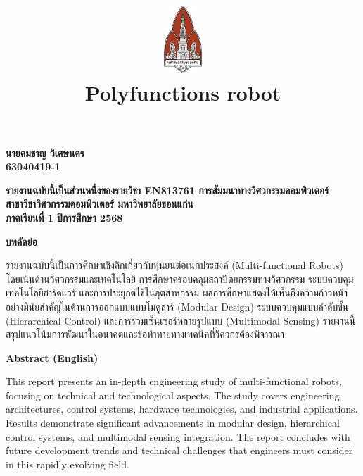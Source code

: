 \documentclass[a4paper]{article}
\date{}
\author{}
\title{
    \includegraphics[width=1in, height=1in, keepaspectratio]{logo.png}
    \\[2ex]
    {\fontsize{32pt}{36pt}\selectfont\textbf{Polyfunctions robot}}
}
\newcommand{\thaipage}[1]{%
  \ifcase#1\or ก\or ข\or ค\or ง\or จ\or ฉ\or ช\or ซ\or ฌ\or ญ\or
  ฎ\or ฏ\or ฐ\or ฑ\or ฒ\or ณ\or ด\or ต\or ถ\or ท\or ธ\or น\or บ\or ป\or ผ\or ฝ\or พ\or ฟ\or ภ\or ม\or
  ย\or ร\or ล\or ว\or ศ\or ษ\or ส\or ห\or ฬ\or อ\or ฮ\else\arabic{#1}\fi
}
\begin{document}
\maketitle
\thispagestyle{empty}

\vfill
\begin{center}
    {\fontsize{22pt}{26pt}\selectfont\textbf{
        นายคมชาญ วิเศษนคร
        \\ 63040419-1
    }}
\end{center}
\vfill

\vfill
\begin{center}
    {\fontsize{16pt}{20pt}\selectfont\textbf{
        รายงานฉบับนี้เป็นส่วนหนึ่งของรายวิชา EN813761 การสัมมนาทางวิศวกรรมคอมพิวเตอร์
        \\ สาขาวิชาวิศวกรรมคอมพิวเตอร์ มหาวิทยาลัยขอนแก่น
        \\ ภาคเรียนที่ 1 ปีการศึกษา 2568
    }}
\end{center}

\newpage
\setcounter{page}{1}
\renewcommand{\thepage}{\thaipage{\value{page}}}
\pagestyle{plain}

\setcounter{page}{1}
\pagestyle{plain}

\noindent
{\centering
    {\fontsize{18pt}{22pt}\selectfont\textbf{บทคัดย่อ}\par}
}

รายงานฉบับนี้เป็นการศึกษาเชิงลึกเกี่ยวกับหุ่นยนต์อเนกประสงค์ (Multi-functional Robots) โดยเน้นด้านวิศวกรรมและเทคโนโลยี การศึกษาครอบคลุมสถาปัตยกรรมทางวิศวกรรม ระบบควบคุม เทคโนโลยีฮาร์ดแวร์ และการประยุกต์ใช้ในอุตสาหกรรม ผลการศึกษาแสดงให้เห็นถึงความก้าวหน้าอย่างมีนัยสำคัญในด้านการออกแบบแบบโมดูลาร์ (Modular Design) ระบบควบคุมแบบลำดับชั้น (Hierarchical Control) และการรวมเซ็นเซอร์หลายรูปแบบ (Multimodal Sensing) รายงานนี้สรุปแนวโน้มการพัฒนาในอนาคตและข้อท้าทายทางเทคนิคที่วิศวกรต้องพิจารณา

\vspace{1em}

\noindent
{\centering
    {\fontsize{18pt}{22pt}\selectfont\textbf{Abstract (English)}\par}
}

This report presents an in-depth engineering study of multi-functional robots, focusing on technical and technological aspects. The study covers engineering architectures, control systems, hardware technologies, and industrial applications. Results demonstrate significant advancements in modular design, hierarchical control systems, and multimodal sensing integration. The report concludes with future development trends and technical challenges that engineers must consider in this rapidly evolving field.
\end{document}
